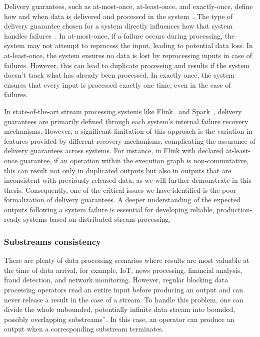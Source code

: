 Delivery guarantees, such as at-most-once, at-least-once, and exactly-once, define how and when data is delivered and processed in the system~\cite{fragkoulis2024survey, carbone2018scalable, Akidau:2013:MFS:2536222.2536229}. The type of delivery guarantee chosen for a system directly influences how that system handles failures~\cite{zhang2024survey, silvestre2021clonos, wang2021consistency}. In at-most-once, if a failure occurs during processing, the system may not attempt to reprocess the input, leading to potential data loss. In at-least-once, the system ensures no data is lost by reprocessing inputs in case of failures. However, this can lead to duplicate processing and results if the system doesn't track what has already been processed. In exactly-once, the system ensures that every input is processed exactly one time, even in the case of failures.

In state-of-the-art stream processing systems like Flink~\cite{Carbone:2017:SMA:3137765.3137777} and Spark~\cite{Zaharia:2012:DSE:2342763.2342773}, delivery guarantees are primarily defined through each system's internal failure recovery mechanisms. However, a significant limitation of this approach is the variation in features provided by different recovery mechanisms, complicating the assurance of delivery guarantees across systems. For instance, in Flink with declared at-least-once guarantee, if an operation within the execution graph is non-commutative, this can result not only in duplicated outputs but also in outputs that are inconsistent with previously released data, as we will further demonstrate in this thesis. Consequently, one of the critical issues we have identified is the poor formalization of delivery guarantees. A deeper understanding of the expected outputs following a system failure is essential for developing reliable, production-ready systems based on distributed stream processing.

\subsubsection{Substreams consistency}

There are plenty of data processing scenarios where results are most valuable at the time of data arrival, for example, IoT, news processing, financial analysis, fraud detection, and network monitoring. However, regular blocking data processing operators read an entire input before producing an output and can never release a result in the case of a stream. To handle this problem, one can divide the whole unbounded, potentially infinite data stream into bounded, possibly overlapping substreams˜\cite{tucker2003exploiting}. In this case, an operator can produce an output when a corresponding substream terminates.

